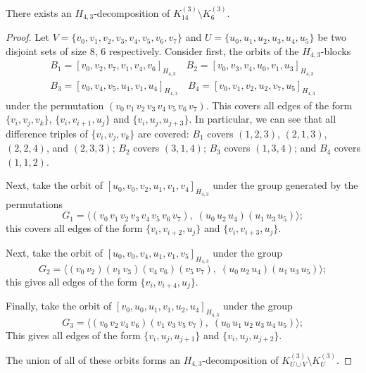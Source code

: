 \begin{subappendices}

\begin{example} \label{eg:H_43-k14-k6}
There exists an $H_{4,3}$-decomposition of $K_{14}^{(3)} \setminus K_{6}^{(3)}$.
\end{example}

\begin{proof}
Let $V = \{v_0, v_1, v_2, v_3, v_4, v_5, v_6, v_7\}$ and $U = \{u_0, u_1, u_2,
u_3, u_4, u_5\}$ be two disjoint sets of size 8, 6 respectively. Consider first, the orbits of the $H_{4,3}$-blocks
\begin{align*}
    B_1 = [v_0, v_2, v_7, v_1, v_4, v_6]_{H_{4,3}} \quad
    B_2 = [v_0, v_3, v_4, u_0, v_1, u_3]_{H_{4,3}} \\
    B_3 = [v_0, v_4, v_5, u_1, v_1, u_4]_{H_{4,3}} \quad
    B_4 = [v_0, v_1, v_2, u_2, v_7, u_5]_{H_{4,3}}
\end{align*}
under the permutation $(v_0 \, v_1 \, v_2 \, v_3 \, v_4 \, v_5 \, v_6 \, v_7)$.
This covers all edges of the form $\{v_i, v_j, v_k\}$, $\{v_i, v_{i+1}, u_j\}$ and $\{v_i, u_j, u_{j+3}\}$.
In particular, we can see that all difference triples of $\{v_i, v_j, v_k\}$ are covered:
$B_1$ covers $(1, 2, 3)$, $(2, 1, 3)$, $(2, 2, 4)$, and $(2, 3, 3)$; $B_2$ covers $(3, 1, 4)$; $B_3$ covers $(1, 3, 4)$; and $B_4$ covers $(1, 1, 2)$.

Next, take the orbit of $[u_0, v_0, v_2, u_1, v_1, v_4]_{H_{4,3}}$ under the group generated by the permutations
\[
    G_1 = \langle (v_0 \, v_1 \, v_2 \, v_3 \, v_4 \, v_5 \, v_6 \, v_7),
    \; (u_0 \, u_2 \, u_4) (u_1 \, u_3 \, u_5) \rangle;
\]
this covers all edges of the form $\{v_i, v_{i+2}, u_j\}$ and $\{v_i, v_{i+3}, u_j\}$.

Next, take the orbit of $[u_0, v_0, v_4, u_1, v_1, v_5]_{H_{4,3}}$ under the group
\[
    G_2 = \langle (v_0 \, v_2) (v_1 \, v_3) (v_4 \, v_6) (v_5 \, v_7), \;
    (u_0 \, u_2 \, u_4) (u_1 \, u_3 \, u_5) \rangle;
\]
this gives all edges of the form $\{v_i, v_{i+4}, u_j\}$.

Finally, take the orbit of $[v_0, u_0, u_1, v_1, u_2, u_4]_{H_{4,3}}$ under the group
\[
    G_3 = \langle (v_0 \, v_2 \, v_4 \, v_6) (v_1 \, v_3 \, v_5 \, v_7), \;
    (u_0 \, u_1 \, u_2 \, u_3 \, u_4 \, u_5) \rangle;
\]
This gives all edges of the form $\{v_i, u_j, u_{j+1}\}$ and $\{v_i, u_j, u_{j+2}\}$.

The union of all of these orbits forms an $H_{4,3}$-decomposition of $K_{U \cup
V}^{(3)} \setminus K_{U}^{(3)}$.
\end{proof}


\end{subappendices}
